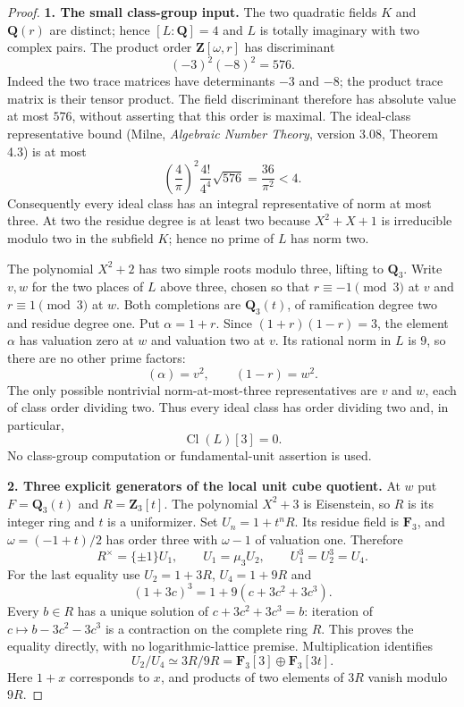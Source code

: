 \begin{proof}
\textbf{1. The small class-group input.}
The two quadratic fields $K$ and $\mathbf Q(r)$ are distinct; hence
$[L:\mathbf Q]=4$ and $L$ is totally imaginary with two complex pairs.
The product order $\mathbf Z[\omega,r]$ has discriminant
\[
                  (-3)^2(-8)^2=576.                  \tag{G187.3}
\]
Indeed the two trace matrices have determinants $-3$ and $-8$;
the product trace matrix is their tensor product.  The field
discriminant therefore has absolute value at most $576$, without
asserting that this order is maximal.  The ideal-class representative
bound (Milne, \emph{Algebraic Number Theory}, version 3.08, Theorem 4.3)
is at most
\[
 \left(\frac4\pi\right)^2\frac{4!}{4^4}\sqrt{576}
                    =\frac{36}{\pi^2}<4.             \tag{G187.4}
\]
Consequently every ideal class has an integral representative of norm
at most three.  At two the residue degree is at least two because
$X^2+X+1$ is irreducible modulo two in the subfield $K$; hence no prime
of $L$ has norm two.

The polynomial $X^2+2$ has two simple roots modulo three, lifting to
$\mathbf Q_3$.  Write $v,w$ for the two places of $L$ above three,
chosen so that $r\equiv-1\pmod3$ at $v$ and $r\equiv1\pmod3$ at $w$.
Both completions are $\mathbf Q_3(t)$, of ramification degree two and
residue degree one.  Put $\alpha=1+r$.  Since
$(1+r)(1-r)=3$, the element $\alpha$ has valuation zero at $w$ and
valuation two at $v$.  Its rational norm in $L$ is $9$, so there are
no other prime factors:
\[
                  (\alpha)=v^2,\qquad(1-r)=w^2.
                                                        \tag{G187.5}
\]
The only possible nontrivial norm-at-most-three representatives are
$v$ and $w$, each of class order dividing two.  Thus every ideal class
has order dividing two and, in particular,
\[
                             \operatorname{Cl}(L)[3]=0.
                                                        \tag{G187.6}
\]
No class-group computation or fundamental-unit assertion is used.

\textbf{2. Three explicit generators of the local unit cube quotient.}
At $w$ put $F=\mathbf Q_3(t)$ and $R=\mathbf Z_3[t]$.
The polynomial $X^2+3$ is Eisenstein, so $R$ is its integer ring and
$t$ is a uniformizer.  Set $U_n=1+t^nR$.  Its residue field is
$\mathbf F_3$, and $\omega=(-1+t)/2$ has order three with
$\omega-1$ of valuation one.  Therefore
\[
 R^\times=\{\pm1\}U_1,\qquad U_1=\mu_3U_2,
       \qquad U_1^3=U_2^3=U_4.                        \tag{G187.7}
\]
For the last equality use $U_2=1+3R$, $U_4=1+9R$ and
\[
        (1+3c)^3=1+9(c+3c^2+3c^3).
\]
Every $b\in R$ has a unique solution of
$c+3c^2+3c^3=b$: iteration of $c\mapsto b-3c^2-3c^3$ is a
contraction on the complete ring $R$.  This proves the equality
directly, with no logarithmic-lattice premise.
Multiplication identifies
\[
                  U_2/U_4\simeq 3R/9R
                     =\mathbf F_3[3]\oplus\mathbf F_3[3t].
                                                        \tag{G187.8}
\]
Here $1+x$ corresponds to $x$, and products of two elements of $3R$
vanish modulo $9R$.


\end{proof}
